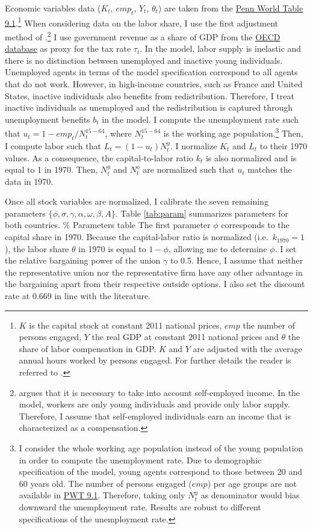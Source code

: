 \documentclass[
]{article}
\begin{document}
Economic variables data (\(K_t\), \(emp_t\), \(Y_t\), \(\theta_t\)) are taken from the \href{https://www.rug.nl/ggdc/productivity/pwt/}{Penn World Table 9.1}.\footnote{\(K\) is the capital stock at constant 2011 national prices, \(emp\) the number of persons engaged, \(Y\) the real GDP at constant 2011 national prices and \(\theta\) the share of labor compensation in GDP. \(K\) and \(Y\) are adjusted with the average annual hours worked by persons engaged. For further details the reader is referred to \citet{Feenstra2015}.} When considering data on the labor share, I use the first adjustment method of \citet{Feenstra2015}.\footnote{\citet{Gollin2002} argues that it is necessary to take into account self-employed income. In the model, workers are only young individuals and provide only labor supply. Therefore, I assume that self-employed individuals earn an income that is characterized as a compensation.} I use government revenue as a share of GDP from the \href{https://data.oecd.org/tax/tax-revenue.htm}{OECD database} as proxy for the tax rate \(\tau_t\).
In the model, labor supply is inelastic and there is no distinction between unemployed and inactive young individuals. Unemployed agents in terms of the model specification correspond to all agents that do not work. However, in high-income countries, such as France and United States, inactive individuals also benefits from redistribution. Therefore, I treat inactive individuals as unemployed and the redistribution is captured through unemployment benefits \(b_t\) in the model.
I compute the unemployment rate such that \(u_t = 1 - emp_t/N^{15-64}_t\), where \(N_t^{15-64}\) is the working age population.\footnote{I consider the whole working age population instead of the young population in order to compute the unemployment rate. Due to demographic specification of the model, young agents correspond to those between 20 and 60 years old. The number of persons engaged (\(emp\)) per age groups are not available in \href{https://www.rug.nl/ggdc/productivity/pwt/}{PWT 9.1}. Therefore, taking only \(N^y_t\) as denominator would bias downward the unemployment rate. Results are robust to different specifications of the unemployment rate.}
Then, I compute labor such that \(L_t=(1-u_t)N_t^y\). I normalize \(K_t\) and \(L_t\) to their 1970 values. As a consequence, the capital-to-labor ratio \(k_t\) is also normalized and is equal to 1 in 1970. Then, \(N_t^y\) and \(N_t^o\) are normalized such that \(u_t\) matches the data in 1970.

Once all stock variables are normalized, I calibrate the seven remaining parameters \(\lbrace \phi, \sigma, \gamma, \alpha, \omega, \beta, A \rbrace\). Table \ref{tab:param} summarizes parameters for both countries.
\% Parameters table
The first parameter \(\phi\) corresponds to the capital share in 1970. Because the capital-labor ratio is normalized (i.e.~\(k_{1970} = 1\)), the labor share \(\theta\) in 1970 is equal to \(1-\phi\), allowing me to determine \(\phi\). I set the relative bargaining power of the union \(\gamma\) to 0.5. Hence, I assume that neither the representative union nor the representative firm have any other advantage in the bargaining apart from their respective outside options. I also set the discount rate at 0.669 in line with the literature.
\end{document}
